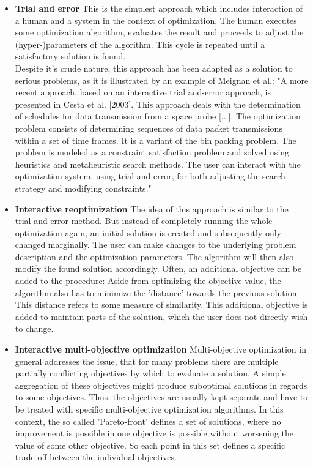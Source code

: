 \begin{itemize}
\item \textbf{Trial and error} This is the simplest approach which includes interaction of a human and a system in the context of optimization. The human executes some optimization algorithm, evaluates the result and proceeds to adjust the (hyper-)parameters of the algorithm. This cycle is repeated until a satisfactory solution is found.\\
Despite it's crude nature, this approach has been adapted as a solution to serious problems, as it is illustrated by an example of Meignan et al.: "A more recent approach, based on an interactive trial and-error approach, is presented in Cesta et al. [2003]. This approach deals with the determination of schedules for data transmission from a space probe [...]. The optimization problem consists of determining sequences of data packet transmissions within a set of time frames. It is a variant of the bin packing problem. The problem is modeled as a constraint satisfaction problem and solved using heuristics and metaheuristic search methods. The user can interact with the optimization system, using trial and error, for both adjusting the search strategy and modifying constraints."\cite[p.17:14]{meignan_review_2015}
\item \textbf{Interactive reoptimization} The idea of this approach is similar to the trial-and-error method. But instead of completely running the whole optimization again, an initial solution is created and subsequently only changed marginally. The user can make changes to the underlying problem description and the optimization parameters. The algorithm will then also modify the found solution accordingly. Often, an additional objective can be added to the procedure: Aside from optimizing the objective value, the algorithm also has to minimize the 'distance' towards the previous solution. This distance refers to some measure of similarity. This additional objective is added to maintain parts of the solution, which the user does not directly wish to change.
\item \textbf{Interactive multi-objective optimization} Multi-objective optimization in general addresses the issue, that for many problems there are multiple partially conflicting objectives by which to evaluate a solution. A simple aggregation of these objectives might produce suboptimal solutions in regards to some objectives. Thus, the objectives are usually kept separate and have to be treated with specific multi-objective optimization algorithms. In this context, the so called 'Pareto-front' defines a set of solutions, where no improvement is possible in one objective is possible without worsening the value of some other objective. So each point in this set defines a specific trade-off between the individual objectives.\\

\end{itemize}
